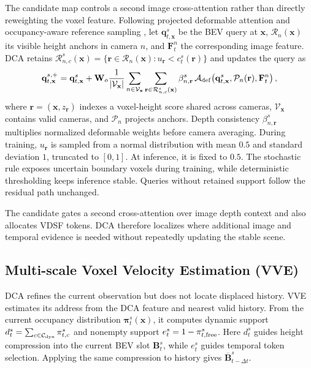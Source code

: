 \documentclass{article}
\begin{document}
The candidate map controls a second image cross-attention rather than directly
reweighting the voxel feature. Following projected deformable attention
\citep{BEVFormer} and occupancy-aware reference sampling
\citep{STCOcc}, let $\mathbf q_{t,\mathbf x}^s$ be the BEV query at
$\mathbf x$, $\mathcal R_n(\mathbf x)$ its visible height anchors in camera
$n$, and $\mathbf F_t^n$ the corresponding image feature. DCA retains
$\mathcal R_{n,c}^s(\mathbf x)=\{\mathbf r\in\mathcal R_n(\mathbf x):
u_{\mathbf r}<c_t^s(\mathbf r)\}$ and updates the query as
\begin{equation}
 \begin{aligned}
 \mathbf q_{t,\mathbf x}^{s,+}=\mathbf q_{t,\mathbf x}^{s}
  +\mathbf W_o\frac{1}{|\mathcal V_{\mathbf x}|}
  \sum_{n\in\mathcal V_{\mathbf x}}\sum_{\mathbf r\in
  \mathcal R_{n,c}^s(\mathbf x)}
  \beta_{n,\mathbf r}^s\,
  \mathcal A_{\rm def}\!\left(
  \mathbf q_{t,\mathbf x}^{s},\mathcal P_n(\mathbf r),\mathbf F_t^n\right),
 \end{aligned}
 \label{eq:dca_cross_attention}
\end{equation}
where $\mathbf r=(\mathbf x,z_{\mathbf r})$ indexes a voxel-height score shared
across cameras, $\mathcal V_{\mathbf x}$ contains valid cameras, and
$\mathcal P_n$ projects anchors. Depth consistency $\beta_{n,\mathbf r}^s$
multiplies normalized deformable weights before camera averaging. During
training, $u_{\mathbf r}$ is sampled from a normal distribution
with mean $0.5$ and standard deviation $1$, truncated to $[0,1]$. At inference,
it is fixed to $0.5$. The stochastic
rule exposes uncertain boundary voxels during training, while deterministic
thresholding keeps inference stable. Queries without retained support follow
the residual path unchanged.

The candidate gates a second cross-attention over image depth context and also
allocates VDSF tokens. DCA therefore localizes where additional image and
temporal evidence is needed without repeatedly updating the stable scene.


\subsection{Multi-scale Voxel Velocity Estimation (VVE)}
\label{sec:vve}

DCA refines the current observation but does not locate displaced history. VVE
estimates its address from the DCA feature and nearest valid history. From the
current occupancy distribution $\boldsymbol\pi_t^s(\mathbf x)$, it computes
dynamic support
$d_t^s=\sum_{c\in\mathcal C_{\rm dyn}}\pi_{t,c}^s$ and nonempty support
$e_t^s=1-\pi_{t,\rm free}^s$. Here $d_t^s$ guides height compression into the
current BEV slot $\mathbf B_t^s$, while $e_t^s$ guides temporal token selection.
Applying the same compression to history gives
$\overline{\mathbf B}_{t-\Delta t}^s$.
\end{document}
